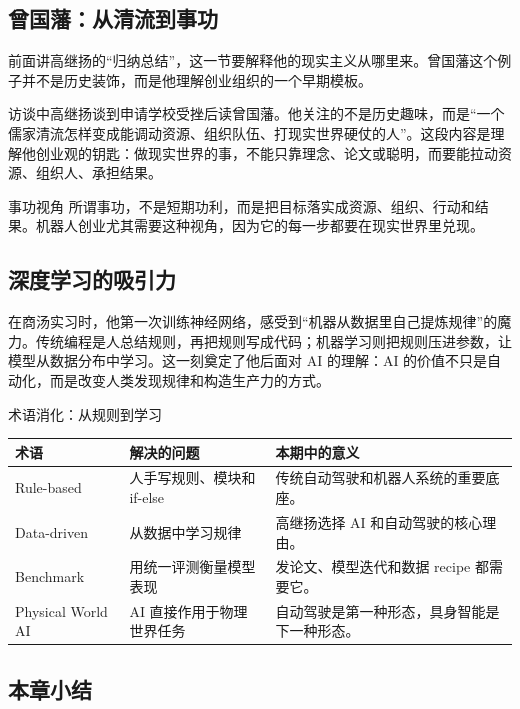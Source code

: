 \documentclass[a4paper]{article}
\begin{document}
\subsection{曾国藩：从清流到事功}

前面讲高继扬的“归纳总结”，这一节要解释他的现实主义从哪里来。曾国藩这个例子并不是历史装饰，而是他理解创业组织的一个早期模板。

访谈中高继扬谈到申请学校受挫后读曾国藩。他关注的不是历史趣味，而是“一个儒家清流怎样变成能调动资源、组织队伍、打现实世界硬仗的人”。这段内容是理解他创业观的钥匙：做现实世界的事，不能只靠理念、论文或聪明，而要能拉动资源、组织人、承担结果。

\begin{importantbox}{事功视角}
所谓事功，不是短期功利，而是把目标落实成资源、组织、行动和结果。机器人创业尤其需要这种视角，因为它的每一步都要在现实世界里兑现。
\end{importantbox}

\subsection{深度学习的吸引力}

在商汤实习时，他第一次训练神经网络，感受到“机器从数据里自己提炼规律”的魔力。传统编程是人总结规则，再把规则写成代码；机器学习则把规则压进参数，让模型从数据分布中学习。这一刻奠定了他后面对 AI 的理解：AI 的价值不只是自动化，而是改变人类发现规律和构造生产力的方式。

\begin{knowledgebox}{术语消化：从规则到学习}
\begin{tabularx}{\textwidth}{p{}p{}X}
\toprule
术语 & 解决的问题 & 本期中的意义 \\
\midrule
Rule-based & 人手写规则、模块和 if-else & 传统自动驾驶和机器人系统的重要底座。 \\
Data-driven & 从数据中学习规律 & 高继扬选择 AI 和自动驾驶的核心理由。 \\
Benchmark & 用统一评测衡量模型表现 & 发论文、模型迭代和数据 recipe 都需要它。 \\
Physical World AI & AI 直接作用于物理世界任务 & 自动驾驶是第一种形态，具身智能是下一种形态。 \\
\bottomrule
\end{tabularx}
\end{knowledgebox}

\subsection{本章小结}
\end{document}
